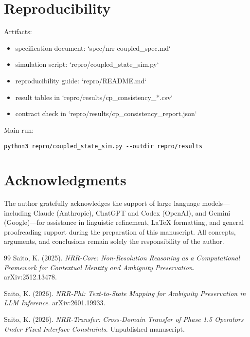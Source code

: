 \documentclass[11pt,a4paper]{article}
\begin{document}
\section{Reproducibility}
Artifacts:
\begin{itemize}
  \item specification document: `spec/nrr-coupled\_spec.md`
  \item simulation script: `repro/coupled\_state\_sim.py`
  \item reproducibility guide: `repro/README.md`
  \item result tables in `repro/results/cp\_consistency\_*.csv`
  \item contract check in `repro/results/cp\_consistency\_report.json`
\end{itemize}

Main run:
\begin{lstlisting}
python3 repro/coupled_state_sim.py --outdir repro/results
\end{lstlisting}

\section*{Acknowledgments}

The author gratefully acknowledges the support of large language
models---including Claude (Anthropic), ChatGPT and Codex (OpenAI), and Gemini (Google)---for assistance in linguistic refinement,
LaTeX formatting, and general proofreading support during the
preparation of this manuscript.
All concepts, arguments, and conclusions remain solely the
responsibility of the author.

\begin{thebibliography}{99}
Saito, K. (2025).
\textit{NRR-Core: Non-Resolution Reasoning as a Computational Framework for Contextual Identity and Ambiguity Preservation}.
arXiv:2512.13478.

Saito, K. (2026).
\textit{NRR-Phi: Text-to-State Mapping for Ambiguity Preservation in LLM Inference}.
arXiv:2601.19933.

Saito, K. (2026).
\textit{NRR-Transfer: Cross-Domain Transfer of Phase 1.5 Operators Under Fixed Interface Constraints}.
Unpublished manuscript.
\end{thebibliography}
\end{document}
